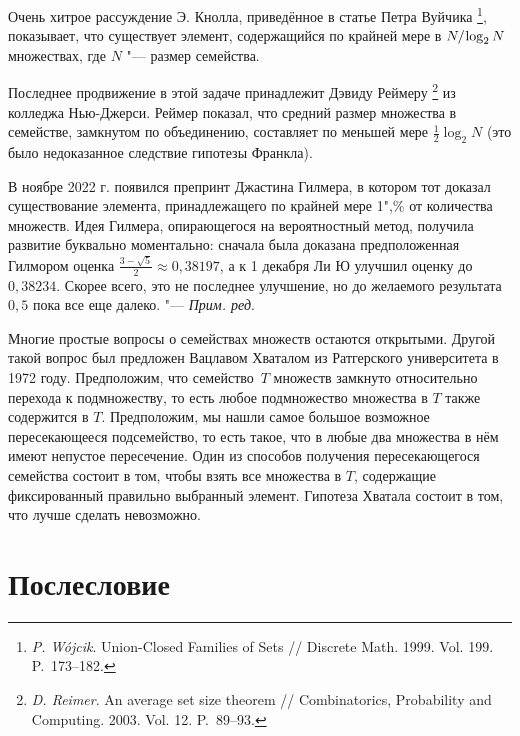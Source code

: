\documentclass[twoside]{book}
\newenvironment{addedbytheeditors}{\par\medskip\small
}{\par\addvspace{\medskipamount}} %
\begin{document}
Очень хитрое рассуждение Э. Кнолла, приведённое в статье Петра Вуйчика%
\footnote{\emph{P. W\'{o}jcik}. Union-Closed Families of Sets /\!/ {Discrete Math.} 1999. Vol. 199. P.~173--182.},
показывает, что существует элемент, содержащийся по крайней мере в $N/\mkern-2mu\log_2 N$ множествах, где $N$ "--- размер семейства.

Последнее продвижение в этой задаче принадлежит Дэвиду Реймеру%
\footnote{\emph{D. Reimer}. An average set size theorem /\!/ {Combinatorics, Probability and Computing.} 2003. Vol. 12. P.~89--93.} из колледжа Нью-Джерси.
Реймер показал, что средний размер множества в семействе, замкнутом по объединению, составляет по меньшей мере $\tfrac12\log_2N$ (это было недоказанное следствие гипотезы Франкла).

\begin{addedbytheeditors}
В ноябре 2022 г. появился препринт Джастина Гилмера, в котором тот доказал существование элемента, принадлежащего по крайней мере 1",\% от количества множеств. Идея Гилмера, опирающегося на вероятностный метод, получила развитие буквально моментально: сначала была доказана предположенная Гилмором оценка $\frac{3-\sqrt5}2\approx0{,}38197$,\vspace{.5\jot} а к 1 декабря Ли Ю улучшил оценку до $0{,}38234$. Скорее всего, это не последнее улучшение, но до желаемого результата $0{,}5$ пока все еще далеко. "--- \emph{Прим. ред}.
\end{addedbytheeditors}

Многие простые вопросы о семействах множеств остаются открытыми.
Другой такой вопрос был предложен Вацлавом Хваталом из Ратгерского
университета в 1972 году.
Предположим, что семейство~$T$ множеств
замкнуто относительно перехода к подмножеству, то есть любое
подмножество множества в $T$ также содержится в $T$.
Предположим, мы
нашли самое большое возможное пересекающееся подсемейство,
то есть такое, что в любые два множества в нём имеют непустое
пересечение.
Один из способов получения пересекающегося семейства
состоит в том, чтобы взять все множества в $T$, содержащие
фиксированный правильно выбранный элемент.
Гипотеза Хватала состоит в
том, что лучше сделать невозможно.

\chapter{Послесловие}

\thispagestyle{empty}
\end{document}
